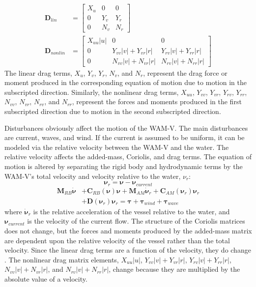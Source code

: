 \documentclass[letterpaper, 10 pt, conference]{ieeeconf}  %
\begin{document}
%
\begin{align}
\bm{D}_{lin} &=
\left[
\begin{matrix}
X_u & 0 & 0 \\
0 & Y_v & Y_r \\
0 & N_v & N_r
\end{matrix}
\right]\\
%
\bm{D}_{nonlin} &= \left[
\begin{matrix}
X_{uu}|u| & 0 & 0\\
0 & Y_{vv}|v| + Y_{vr}|r| & Y_{rv}|v| + Y_{rr}|r|\\
0 & N_{vv}|v| + N_{vr}|r| & N_{rv}|v| + N_{rr}|r|
\end{matrix}
\right]
\end{align}
%
The linear drag terms, $X_u$, $Y_v$, $Y_r$, $N_v$, and $N_r$, represent the drag force or moment produced in the corresponding equation of motion due to motion in the subscripted direction. Similarly, the nonlinear drag terms, $X_{uu}$, $Y_{vv}$, $Y_{vr}$, $Y_{rv}$, $Y_{rr}$, $N_{vv}$, $N_{vr}$, $N_{rv}$, and $N_{rr}$, represent the forces and moments produced in the first subscripted direction due to motion in the second subscripted direction.

Disturbances obviously affect the motion of the WAM-V. The main disturbances are current, waves, and wind. If the current is assumed to be uniform, it can be modeled via the relative velocity between the WAM-V and the water. The relative velocity affects the added-mass, Coriolis, and drag terms. The equation of motion is altered by separating the rigid body and hydrodynamic terms by the WAM-V's total velocity and velocity relative to the water, $\nu_r$:
%
\begin{equation}
\bm{\nu}_{r} = \bm{\nu} - \bm{\nu}_{current}
\end{equation}
%
\begin{align}
\bm{M}_{RB}\dot{\bm{\nu}} &+ \bm{C}_{RB}\left(\bm{\nu}\right)\bm{\nu} + \bm{M}_{AM}\dot{\bm{\nu}}_{r} + \bm{C}_{AM}\left(\bm{\nu}_{r}\right)\bm{\nu}_{r} \\
&+\bm{D}\left(\bm{\nu}_r\right)\bm{\nu}_r = \bm{\tau} + \bm{\tau}_{wind} + \bm{\tau}_{wave} \nonumber
\end{align}
%
where $\dot{\bm{\nu}}_{r}$ is the relative acceleration of the vessel relative to the water, and $\bm{\nu}_{current}$ is the velocity of the current flow. The structure of the Coriolis matrices does not change, but the forces and moments produced by the added-mass matrix are dependent upon the relative velocity of the vessel rather than the total velocity. Since the linear drag terms are a function of the velocity, they do change \cite{Klinger:17a}. The nonlinear drag matrix elements, $X_{uu}|u|$, $Y_{vv}|v| + Y_{vr}|r|$, $Y_{rv}|v| + Y_{rr}|r|$, $N_{vv}|v| + N_{vr}|r|$, and $N_{rv}|v| + N_{rr}|r|$, change because they are multiplied by the absolute value of a velocity.
\end{document}
